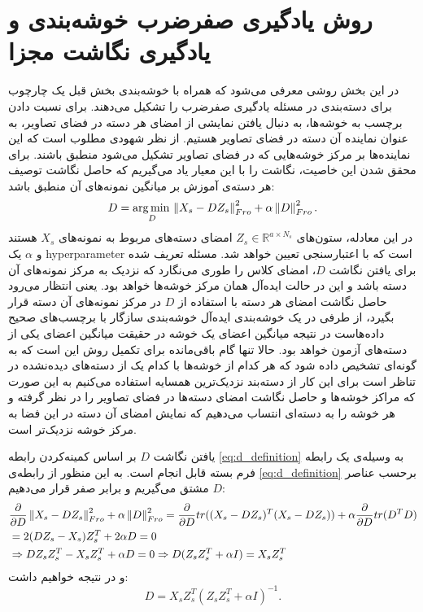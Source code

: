 \section{روش یادگیری صفرضرب خوشه‌بندی و یادگیری نگاشت مجزا} \label{simple_method}
در این بخش روشی معرفی می‌شود که همراه با خوشه‌بندی بخش قبل یک چارچوب برای دسته‌بندی در مسئله یادگیری صفرضرب را تشکیل می‌دهند. برای نسبت دادن برچسب به خوشه‌ها، به دنبال یافتن نمایشی از امضای هر دسته در فضای تصاویر، به عنوان نماینده آن دسته در فضای تصاویر هستیم. از نظر شهودی مطلوب است که این نماینده‌ها بر مرکز خوشه‌هایی که در فضای تصاویر تشکیل می‌شود منطبق باشند. برای محقق شدن این خاصیت، نگاشت را با این معیار یاد می‌گیریم که حاصل نگاشت توصیف هر دسته‌ی آموزش بر میانگین نمونه‌های آن منطبق باشد:
\begin{equation} \label{eq:d_definition}
  D = \operatorname*{arg\,min\,}_D \left \lVert X_s - D Z_s \right \rVert_{Fro}^2 + \alpha \left \lVert D \right \rVert_{Fro}^2.
\end{equation}
در این معادله، ستون‌های
 $Z_s \in \mathbb{R}^{a \times N_s}$
  امضای دسته‌های مربوط به نمونه‌های $X_s$ هستند و $\alpha$ یک \gls{hyperparameter} است که با اعتبارسنجی تعیین خواهد شد. مسئله تعریف شده برای یافتن نگاشت $D$، امضای کلاس را طوری می‌نگارد که نزدیک به مرکز نمونه‌های آن دسته باشد و این در حالت ایده‌آل همان مرکز خوشه‌ها خواهد بود. یعنی انتظار می‌رود
  حاصل نگاشت امضای هر دسته با استفاده از $D$ در مرکز نمونه‌های آن دسته قرار بگیرد، از طرفی در یک خوشه‌بندی ایده‌آل خوشه‌بندی سازگار با برچسب‌های صحیح داده‌هاست در نتیجه میانگین اعضای یک خوشه در حقیقت میانگین اعضای یکی از دسته‌های آزمون خواهد بود. حالا تنها گام باقی‌مانده برای تکمیل روش این است که به گونه‌ای تشخیص داده شود که هر کدام از خوشه‌ها با کدام یک از دسته‌های دیده‌نشده در تناظر است برای این کار از دسته‌بند نزدیک‌ترین همسایه استفاده می‌کنیم به این صورت که مراکز خوشه‌ها و حاصل نگاشت امضای دسته‌ها در فضای تصاویر را در نظر گرفته و هر خوشه را به دسته‌ای انتساب می‌دهیم که نمایش  امضای آن دسته در این فضا به مرکز خوشه نزدیک‌تر است.

یافتن نگاشت $D$ بر اساس  کمینه‌کردن رابطه
  \eqref{eq:d_definition}
  به وسیله‌ی یک رابطه فرم بسته قابل انجام است.
  به این منظور از رابطه‌ی \eqref{eq:d_definition} برحسب عناصر $D$ مشتق می‌گیریم و برابر صفر قرار می‌دهیم:
  \begin{align*}
  &\frac{\partial}{\partial D} \left \lVert X_s - D Z_s \right \rVert_{Fro}^2 + \alpha \left \lVert D \right \rVert_{Fro}^2 =
    \frac{\partial} {\partial D}tr((X_s -DZ_s)^T (X_s-DZ_s)) + \alpha \frac{\partial}{\partial D}tr(D^TD) \\
& = 2(DZ_s - X_s)Z_s^T + 2 \alpha D =0 \\
&\Rightarrow  DZ_sZ_s^T -  X_sZ_s^T + \alpha D =0 \Rightarrow D(Z_sZ_s^T + \alpha I) =  X_sZ_s^T
  \end{align*}
  و در نتیجه خواهیم داشت:
  \begin{equation} \label{eq:d_answer}
  D = X_s Z_s^T (Z_s Z_s^T + \alpha I)^{-1}.
\end{equation}

